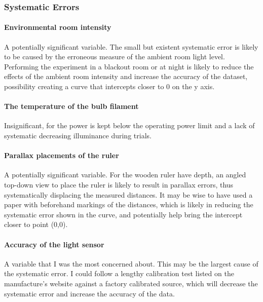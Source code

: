 \documentclass[a4paper,12pt]{article}
\begin{document}
\subsubsection{Systematic Errors}
\paragraph{Environmental room intensity}
A potentially significant variable. The small but existent systematic error is likely to be caused by the erroneous measure of the ambient room light level. Performing the experiment in a blackout room or at night is likely to reduce the effects of the ambient room intensity and increase the accuracy of the dataset, possibility creating a curve that intercepts closer to 0 on the y axis.

\paragraph{The temperature of the bulb filament}
Insignificant, for the power is kept below the operating power limit and a lack of systematic decreasing illuminance during trials.

\paragraph{Parallax placements of the ruler}
A potentially significant variable. For the wooden ruler have depth, an angled top-down view to place the ruler is likely to result in parallax errors, thus systematically displacing the measured distances. It may be wise to have used a paper with beforehand markings of the distances, which is likely in reducing the systematic error shown in the curve, and potentially help bring the intercept closer to point (0,0).

\paragraph{Accuracy of the light sensor}
A variable that I was the most concerned about. This may be the largest cause of the systematic error. I could follow a lengthy calibration test listed on the manufacture's website against a factory calibrated source, which will decrease the systematic error and increase the accuracy of the data.

\newpage
\printbibliography
\end{document}
